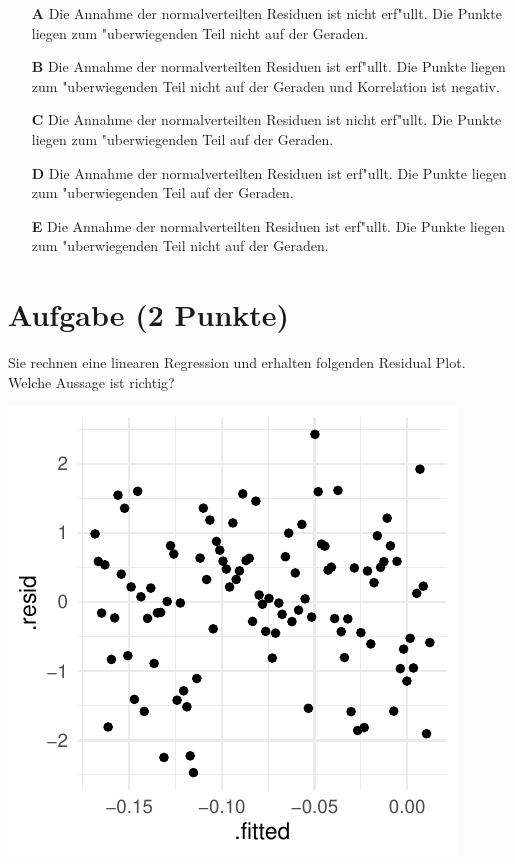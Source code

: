 \documentclass[a4paper, 9pt]{scrartcl}\usepackage[]{graphicx}\usepackage[]{xcolor}
\makeatletter
\def\maxwidth{ %
  \ifdim\Gin@nat@width>\linewidth
    \linewidth
  \else
    \Gin@nat@width
  \fi
}
\makeatother
\begin{document}
\begin{enumerate}
\item [\textbf{A} \msquare] Die Annahme der normalverteilten Residuen ist nicht erf{"u}llt. Die Punkte liegen zum {"u}berwiegenden Teil nicht auf der Geraden.
\item [\textbf{B} \msquare] Die Annahme der normalverteilten Residuen ist erf{"u}llt. Die Punkte liegen zum {"u}berwiegenden Teil nicht auf der Geraden und Korrelation ist negativ.
\item [\textbf{C} \msquare] Die Annahme der normalverteilten Residuen ist nicht erf{"u}llt. Die Punkte liegen zum {"u}berwiegenden Teil auf der Geraden.
\item [\textbf{D} \msquare] Die Annahme der normalverteilten Residuen ist erf{"u}llt. Die Punkte liegen zum {"u}berwiegenden Teil auf der Geraden.
\item [\textbf{E} \msquare] Die Annahme der normalverteilten Residuen ist erf{"u}llt. Die Punkte liegen zum {"u}berwiegenden Teil nicht auf der Geraden.
\end{enumerate}

\section{Aufgabe \hfill (2 Punkte)}

Sie rechnen eine linearen Regression und erhalten folgenden Residual
Plot. Welche Aussage ist richtig?




{\centering \includegraphics[width=\maxwidth]{img/mc-regression-06-a-1} 

}
\end{document}

